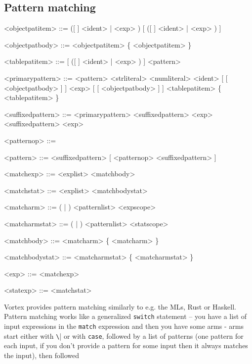 \documentclass{article}
\newenvironment{bnf}
{
\begin{mdframed}
\begin{grammar}
}
{
\end{grammar}
\end{mdframed}
}
\begin{document}
\subsection{Pattern matching}
\begin{bnf}
<objectpatitem> ::= ([ \lit{\$} ] <ident> | \lit{\$(} <exp> \lit{)})
    [ \lit{:} ([ \lit{\$} ] <ident> | \lit{\$(} <exp> \lit{)}) ]

<objectpatbody> ::= <objectpatitem> \{ \lit{,} <objectpatitem> \}

<tablepatitem> ::= [ ([ \lit{\$} ] <ident> | \lit{\$(} <exp> \lit{)})
    \lit{:} ] <pattern>

<primarypattern> ::= \lit{(} <pattern> \lit{)}
    \alt <strliteral>
    \alt <numliteral>
    \alt {}
    \alt {}
    \alt {}
    \alt \lit{_}
    \alt [ \lit{\$} ] <ident> [ \lit{(} [ <objectpatbody> ] \lit{)} ]
    \alt \lit{\$(} <exp> \lit{)} [ \lit{(} [ <objectpatbody> ] \lit{)} ]
    \alt \lit{\{} <tablepatitem> \{ \lit{,} <tablepatitem> \} \lit{\}}

<suffixedpattern> ::= <primarypattern>
    \alt <suffixedpattern>  <exp>
    \alt <suffixedpattern>  <exp>

<patternop> ::= 
    \alt {}
    \alt \lit{::}

<pattern> ::= <suffixedpattern> [ <patternop> <suffixedpattern> ]

<matchexp> ::=  <explist> \lit{->} <matchbody>

<matchstat> ::=  <explist> \lit{->} <matchbodystat>

<matcharm> ::= (\lit{|} | ) <patternlist> <expscope>

<matcharmstat> ::= (\lit{|} | ) <patternlist> <statscope>

<matchbody> ::= <matcharm> \{ <matcharm> \}

<matchbodystat> ::= <matcharmstat> \{ <matcharmstat> \}

<exp> ::= <matchexp>

<statexp> ::= <matchstat>
\end{bnf}
Vortex provides pattern matching similarly to e.g. the MLs, Rust or Haskell.
Pattern matching works like a generalized \verb|switch| statement -- you have
a list of input expressions in the \verb|match| expression and then you have
some arms - arms start either with \verb|\|| or with \verb|case|, followed
by a list of patterns (one pattern for each input, if you don't provide
a pattern for some input then it always matches the input), then followed
\end{document}
